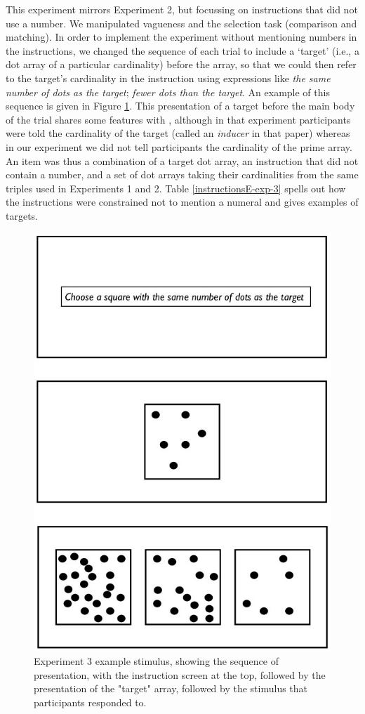 
This experiment mirrors Experiment 2, but focussing on instructions that did not use a number. We manipulated vagueness and the selection task (comparison and matching). In order to implement the experiment without mentioning numbers in the instructions, we changed the sequence of each trial to include a `target' (i.e., a dot array of a particular cardinality) before the array, so that we could then refer to the target's cardinality in the instruction using expressions like \emph{the same number of dots as the target}; \emph{fewer dots than the target}. An example of this sequence is given in Figure \ref{Experiment3examplestimulus}. This presentation of a target before the main body of the trial shares some features with \citeauthor[Experiment 2]{Izard20081221}, although in that experiment participants were told the cardinality of the target (called an \emph{inducer} in that paper) whereas in our experiment we did not tell participants the cardinality of the prime array. An item was thus a combination of a target dot array, an instruction that did not contain a number, and a set of dot arrays taking their cardinalities from the same triples used in Experiments 1 and 2. Table \ref{instructionsE-exp-3} spells out how the instructions were constrained not to mention a numeral and gives examples of targets.

\begin{figure}[htbp]
\centering
\includegraphics[width=.5\textwidth]{figures/Ee3-flow.jpg}
\caption{Experiment 3 example stimulus, showing the sequence of presentation, with the instruction screen at the top, followed by the presentation of the "target" array, followed by the stimulus that participants responded to.}
\label{Experiment3examplestimulus}
\end{figure}

